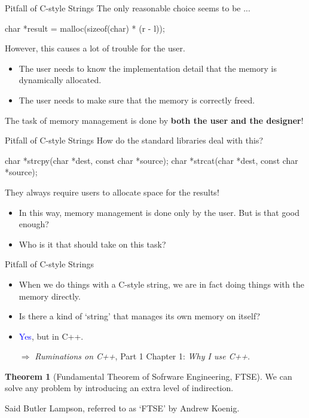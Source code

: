 \documentclass{beamer}
\newcommand{\blue}[1]{\textcolor{blue}{#1}}
\theoremstyle{definition}
\newtheorem{thm}{Theorem}
\begin{document}
\begin{frame}[fragile]{Pitfall of C-style Strings}
    The only reasonable choice seems to be ...
    \begin{cpp}
char *result = malloc(sizeof(char) * (r - l));
    \end{cpp}
    \pause
    However, this causes a lot of trouble for the user.
    \begin{itemize}
        \item The user needs to know the implementation detail that the memory is dynamically allocated.
        \item The user needs to make sure that the memory is correctly freed.
    \end{itemize}
    \pause
    The task of memory management is done by \textbf{both the user and the designer}!
\end{frame}

\begin{frame}[fragile]{Pitfall of C-style Strings}
    How do the standard libraries deal with this?
    \pause
    \begin{cpp}
char *strcpy(char *dest, const char *source);
char *strcat(char *dest, const char *source);
    \end{cpp}
    They always require users to allocate space for the results!
    \pause
    \begin{itemize}
        \item In this way, memory management is done only by the user. But is that good enough?
        \item Who is it that should take on this task?
    \end{itemize}
\end{frame}

\begin{frame}[fragile]{Pitfall of C-style Strings}
    \begin{itemize}
        \item When we do things with a C-style string, we are in fact doing things with the memory directly.
        \item Is there a kind of `string' that manages its own memory on itself?
        \pause
        \item \blue{Yes}, but in C++.
        \item[\(\Rightarrow\)] \textit{Ruminations on C++}, Part 1 Chapter 1: \textit{Why I use C++}.
    \end{itemize}
    \begin{thm}[Fundamental Theorem of Sofrware Engineering, FTSE]
        We can solve any problem by introducing an extra level of indirection.
    \end{thm}
    Said Butler Lampson, referred to as `FTSE' by Andrew Koenig.
\end{frame}
\end{document}
